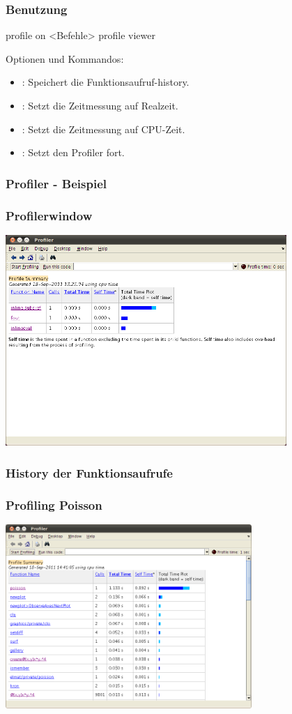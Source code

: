 \documentclass[hyperref={xetex}]{beamer}
\begin{document}
\begin{frame}[fragile]\frametitle{Benutzung}
\begin{matlabin}
profile on 
<Befehle>
profile viewer
\end{matlabin}
Optionen und Kommandos:
\begin{itemize}
 \item {}: Speichert die Funktionsaufruf-history.
 \item {}: Setzt die Zeitmessung auf Realzeit.
\item {}: Setzt die Zeitmessung auf CPU-Zeit.
 \item {}: Setzt den Profiler fort.
\end{itemize}

\end{frame}

\begin{frame}[fragile]\frametitle{Profiler - Beispiel}
\end{frame}

\begin{frame}[fragile]\frametitle{Profilerwindow}
\begin{center}
\includegraphics[width=0.8\textwidth]{./figures/profilertest}
\end{center}
\end{frame}

\begin{frame}[fragile]\frametitle{History der Funktionsaufrufe}
\end{frame}

\begin{frame}[fragile]\frametitle{Profiling Poisson}
\begin{center}
\includegraphics[width=0.7\textwidth]{./figures/profile_poisson}
\end{center}
\end{frame}
\end{document}
